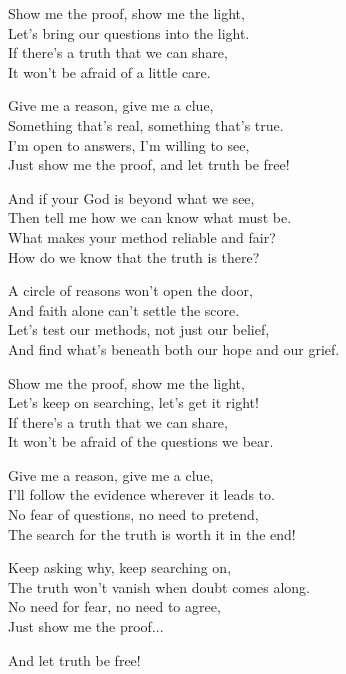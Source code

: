 \begin{lyrics}
Show me the proof, show me the light,\\
Let's bring our questions into the light.\\
If there's a truth that we can share,\\
It won't be afraid of a little care.

Give me a reason, give me a clue,\\
Something that's real, something that's true.\\
I'm open to answers, I'm willing to see,\\
Just show me the proof, and let truth be free!

And if your God is beyond what we see,\\
Then tell me how we can know what must be.\\
What makes your method reliable and fair?\\
How do we know that the truth is there?

A circle of reasons won't open the door,\\
And faith alone can't settle the score.\\
Let's test our methods, not just our belief,\\
And find what's beneath both our hope and our grief.

Show me the proof, show me the light,\\
Let's keep on searching, let's get it right!\\
If there's a truth that we can share,\\
It won't be afraid of the questions we bear.

Give me a reason, give me a clue,\\
I'll follow the evidence wherever it leads to.\\
No fear of questions, no need to pretend,\\
The search for the truth is worth it in the end!

Keep asking why, keep searching on,\\
The truth won't vanish when doubt comes along.\\
No need for fear, no need to agree,\\
Just show me the proof...

And let truth be free!
\end{lyrics}

